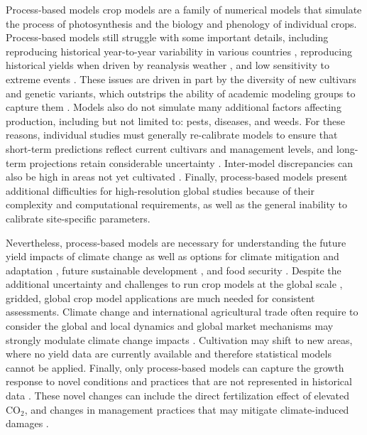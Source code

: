 \documentclass[gmd, manuscript]{copernicus} %
\begin{document}
Process-based models crop models are a family of numerical models that simulate the process of photosynthesis and the biology and phenology of individual crops.
Process-based models still struggle with some important details, including reproducing historical year-to-year variability in various countries \citep[e.g.][]{muller_global_2017}, reproducing historical yields when driven by reanalysis weather \citep[e.g.][]{Glotter14}, and low sensitivity to extreme events \citep[e.g.][]{Glotter15, Jag2018, schewe2019}. 
These issues are driven in part by the diversity of new cultivars and genetic variants, which outstrips the ability of academic modeling groups to capture them \citep[e.g.][]{JONES2017b}. 
Models also do not simulate many additional factors affecting production, including but not limited to: pests, diseases, and weeds. 
For these reasons, individual studies must generally re-calibrate models to ensure that short-term predictions reflect current cultivars and management levels, and long-term projections retain considerable uncertainty \citep{WOLF2002217, JAGTAP200273, Iizumi2010, ANGULO201332, Asseng2013, Asseng2015}. 
Inter-model discrepancies can also be high in areas not yet cultivated \citep[e.g.][]{Challinor2014, WHITE2011357}. 
Finally, process-based models present additional difficulties for high-resolution global studies because of their complexity and computational requirements, as well as the general inability to calibrate site-specific parameters. 

Nevertheless, process-based models are necessary for understanding the future yield impacts of climate change as well as options for climate mitigation \citep{muller2015} and adaptation \citep{challinor2018improving}, future sustainable development \citep{humpenoder2018large}, and food security \citep{wheeler2013climate}. 
Despite the additional uncertainty and challenges to run crop models at the global scale \citep{muller_global_2017}, gridded, global crop model applications are much needed for consistent assessments.
Climate change and international agricultural trade often require to consider the global and local dynamics \citep{rosenzweig2018,ruane2018} and global market mechanisms may strongly modulate climate change impacts \citep{Stevanovic2016,hasegawa2018risk}.
Cultivation may shift to new areas, where no yield data are currently available and therefore statistical models cannot be applied. 
Finally, only process-based models can capture the growth response to novel conditions and practices that are not represented in historical data \citep[e.g.][]{pugh_climate_2016, Roberts2017}. 
These novel changes can include the direct fertilization effect of elevated CO$_2$, and changes in management practices that may mitigate climate-induced damages \citep[e.g.][]{minoli2019modelling}.
\end{document}
